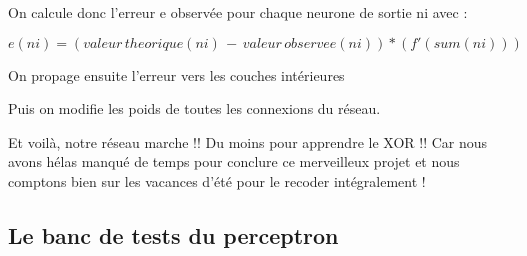 On calcule donc l'erreur e observ\'ee pour chaque neurone de sortie ni avec :

\[
	e(ni) = (valeur\, theorique(ni)\, -\, valeur\, observee(ni))*(f'(sum(ni)))
\]


On propage ensuite l'erreur vers les couches intérieures 

Puis on modifie les poids de toutes les connexions du réseau.

Et voilà, notre réseau marche !! Du moins pour apprendre le XOR !! Car
nous avons hélas manqué de temps pour conclure ce merveilleux projet et
nous comptons bien sur les vacances d'été pour le recoder intégralement
!




\subsection{Le banc de tests du perceptron} %
\label{subsec:le_banc_de_tests_du_perceptron}

